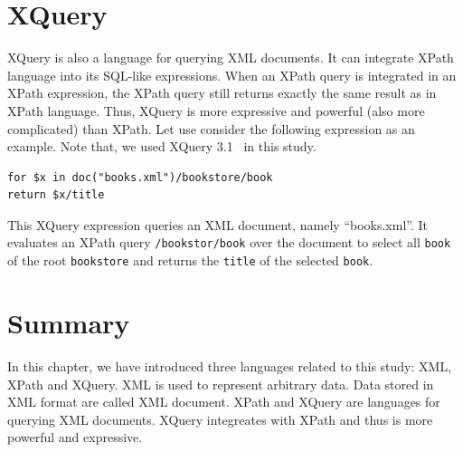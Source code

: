 \section{XQuery}

XQuery is also a language for querying XML documents. It can integrate XPath
language into its SQL-like expressions. When an XPath query is integrated in an
XPath expression, the XPath query still returns exactly the same result as in
XPath language. Thus, XQuery is more expressive and powerful (also more
complicated) than XPath. Let use consider the following expression as an
example. Note that, we used XQuery 3.1~\cite{XQuery3_1} in this study.

\begin{lstlisting}
for $x in doc("books.xml")/bookstore/book
return $x/title
\end{lstlisting}

This XQuery expression queries an XML document, namely ``books.xml''. It
evaluates an XPath query \texttt{/bookstor/book} over the document to select all
\texttt{book} of the root \texttt{bookstore} and returns the \texttt{title} of
the selected \texttt{book}.

\section{Summary}

In this chapter, we have introduced three languages related to this study: XML,
XPath and XQuery. XML is used to represent arbitrary data. Data stored in XML
format are called XML document. XPath and XQuery are languages for querying XML
documents. XQuery integreates with XPath and thus is more powerful and
expressive.
